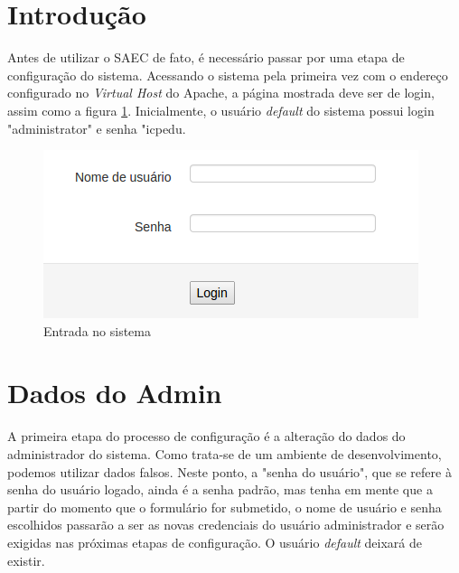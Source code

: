 
\section{Introdução}
Antes de utilizar o SAEC de fato, é necessário passar por uma etapa de configuração do sistema. Acessando o sistema pela primeira vez com o endereço configurado no \textit{Virtual Host} do Apache, a página mostrada deve ser de login, assim como a figura \ref{fig:entrada}. Inicialmente, o usuário \textit{default} do sistema possui login "administrator" e senha "icpedu.

\begin{figure}[h]
     \centering
     \includegraphics[scale=0.5]{images/entrada.png}
     \caption{Entrada no sistema}
     \label{fig:entrada}
\end{figure}


\section{Dados do Admin}
A primeira etapa do processo de configuração é a alteração do dados do administrador do sistema. Como trata-se de um ambiente de desenvolvimento, podemos utilizar dados falsos. Neste ponto, a "senha do usuário", que se refere à senha do usuário logado, ainda é a senha padrão, mas tenha em mente que a partir do momento que o formulário for submetido, o nome de usuário e senha escolhidos passarão a ser as novas credenciais do usuário administrador e serão exigidas nas próximas etapas de configuração. O usuário \textit{default} deixará de existir.

